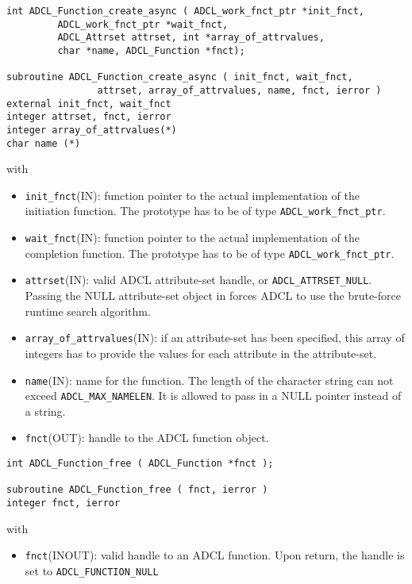 \hspace{1cm}
\begin{verbatim}
int ADCL_Function_create_async ( ADCL_work_fnct_ptr *init_fnct, 
         ADCL_work_fnct_ptr *wait_fnct, 
         ADCL_Attrset attrset, int *array_of_attrvalues, 
         char *name, ADCL_Function *fnct);

subroutine ADCL_Function_create_async ( init_fnct, wait_fnct, 
                attrset, array_of_attrvalues, name, fnct, ierror )
external init_fnct, wait_fnct
integer attrset, fnct, ierror
integer array_of_attrvalues(*)
char name (*)	  
\end{verbatim}
with
\begin{itemize}
\item {\tt init\_fnct}(IN): function pointer to the actual implementation of the initiation function. The prototype has
     to be of type {\tt ADCL\_work\_fnct\_ptr}.
\item {\tt wait\_fnct}(IN): function pointer to the actual implementation of the completion function. The prototype has
     to be of type {\tt ADCL\_work\_fnct\_ptr}.
\item {\tt attrset}(IN): valid ADCL attribute-set handle, or {\tt ADCL\_ATTRSET\_NULL}. Passing the NULL attribute-set 
   object in forces ADCL to use the brute-force runtime search algorithm.
\item {\tt array\_of\_attrvalues}(IN): if an attribute-set has been specified, this array of
 integers has to provide the values for each attribute in the attribute-set. 
\item {\tt name}(IN): name for the function. The length of the character string can not exceed 
  {\tt ADCL\_MAX\_NAMELEN}. It is allowed to pass in a NULL pointer instead of a string.
\item {\tt fnct}(OUT): handle to the ADCL function object.
\end{itemize}


\hspace{1cm}
\begin{verbatim}
int ADCL_Function_free ( ADCL_Function *fnct );

subroutine ADCL_Function_free ( fnct, ierror )
integer fnct, ierror
\end{verbatim}
with
\begin{itemize}
\item {\tt fnct}(INOUT): valid handle to an ADCL function. Upon return, the handle is set to {\tt ADCL\_FUNCTION\_NULL}
\end{itemize}

